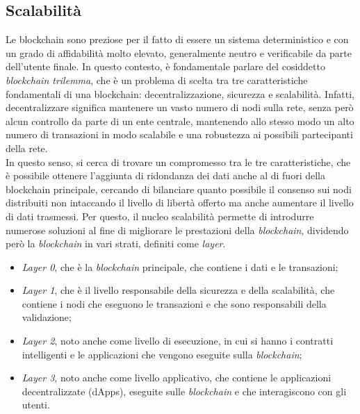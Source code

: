 \subsection{Scalabilità}\label{sec:tecnologie-blockchain-avanzate-scalabilita}
Le blockchain sono preziose per il fatto di essere un sistema deterministico e con un grado di affidabilità molto elevato, generalmente neutro e verificabile da parte dell'utente finale.
In questo contesto, è fondamentale parlare del cosiddetto \textit{blockchain trilemma}, che è un problema di scelta tra tre caratteristiche fondamentali di una blockchain: decentralizzazione, sicurezza e scalabilità.
Infatti, decentralizzare significa mantenere un vasto numero di nodi sulla rete, senza però alcun controllo da parte di un ente centrale, 
mantenendo allo stesso modo un alto numero di transazioni in modo scalabile e una robustezza ai possibili partecipanti della rete. \\

In questo senso, si cerca di trovare un compromesso tra le tre caratteristiche, che è possibile ottenere l'aggiunta di ridondanza dei dati anche al di fuori della blockchain principale,
cercando di bilanciare quanto possibile il consenso sui nodi distribuiti non intaccando il livello di libertà offerto ma anche aumentare il livello di dati trasmessi.
Per questo, il nucleo scalabilità permette di introdurre numerose soluzioni al fine di migliorare le prestazioni della \textit{blockchain}, dividendo però la \textit{blockchain} in vari strati, definiti come \textit{layer}.
\begin{itemize}
    \item{\textit{Layer 0}}, che è la \textit{blockchain} principale, che contiene i dati e le transazioni;
    \item{\textit{Layer 1}}, che è il livello responsabile della sicurezza e della scalabilità, che contiene i nodi che eseguono le transazioni e che sono responsabili della validazione;
    \item{\textit{Layer 2}}, noto anche come livello di esecuzione, in cui si hanno i contratti intelligenti e le applicazioni che vengono eseguite sulla \textit{blockchain};
    \item{\textit{Layer 3}}, noto anche come livello applicativo, che contiene le applicazioni decentralizzate (dApps), eseguite sulle \textit{blockchain} e che interagiscono con gli utenti.
\end{itemize}

